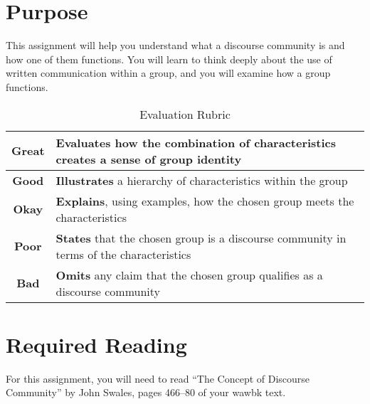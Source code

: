 \documentclass[10pt,oneside,twocolumn]{amsart}	%
\begin{document}
\section{Purpose} %
\label{sec:purpose}
This assignment will help you understand what a discourse community is and how one of them functions. You will learn to think deeply about the use of written communication within a group, and you will examine how a group functions.

\begin{table}[b]
	\caption{Evaluation Rubric}\label{tab:rubric}
\begin{tabulary}{\columnwidth}{cJ}

\toprule 
\textbf{Great} & 	\textbf{Evaluates} how the combination of characteristics creates a sense of group identity	\\
\midrule \textbf{Good} & 	\textbf{Illustrates} a hierarchy of characteristics within the group	\\
\midrule \textbf{Okay} &	\textbf{Explains}, using examples, how the chosen group meets the characteristics	\\
\midrule \textbf{Poor} &	\textbf{States} that the chosen group is a discourse community in terms of the characteristics		\\
\midrule \textbf{Bad} &	\textbf{Omits} any claim that the chosen group qualifies as a discourse community	\\
	\bottomrule
\end{tabulary}
\end{table}

	\section{Required Reading} %
	\label{sec:readings}
	For this assignment, you will need to read ``The Concept of Discourse Community'' by John Swales, pages 466--80 of your \ac{wawbk} text.

\end{document}
